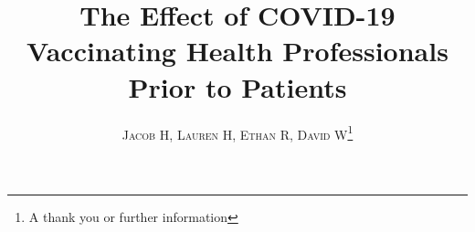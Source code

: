 \documentclass[twoside]{article}
\title{\vspace{-15mm}\fontsize{24pt}{10pt}\selectfont\textbf{The Effect of COVID-19 Vaccinating Health Professionals Prior to Patients }} %
\author{
\large
\textsc{Jacob H, Lauren H, Ethan R, David W}\thanks{A thank you or further information}\\[2mm] %
\vspace{-5mm}
}
\date{}
\begin{document}
\maketitle %

\thispagestyle{fancy} %


\begin{abstract}

\noindent \lipsum[1] %

\end{abstract}

\end{document}
